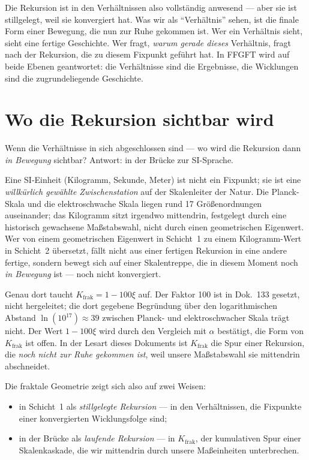 Die Rekursion ist in den Verhältnissen also vollständig anwesend --- aber
sie ist stillgelegt, weil sie konvergiert hat. Was wir als ``Verhältnis''
sehen, ist die finale Form einer Bewegung, die nun zur Ruhe gekommen
ist. Wer ein Verhältnis sieht, sieht eine fertige Geschichte. Wer fragt,
\emph{warum gerade dieses} Verhältnis, fragt nach der Rekursion, die zu
diesem Fixpunkt geführt hat. In FFGFT wird auf beide Ebenen geantwortet:
die Verhältnisse sind die Ergebnisse, die Wicklungen sind die
zugrundeliegende Geschichte.

\section{Wo die Rekursion sichtbar wird}

Wenn die Verhältnisse in sich abgeschlossen sind --- wo wird die
Rekursion dann \emph{in Bewegung} sichtbar? Antwort: in der Brücke zur
SI-Sprache.

Eine SI-Einheit (Kilogramm, Sekunde, Meter) ist nicht ein Fixpunkt; sie
ist eine \emph{willkürlich gewählte Zwischenstation} auf der Skalenleiter
der Natur. Die Planck-Skala und die elektroschwache Skala liegen rund 17
Größenordnungen auseinander; das Kilogramm sitzt irgendwo mittendrin,
festgelegt durch eine historisch gewachsene Maßstabswahl, nicht durch
einen geometrischen Eigenwert. Wer von einem geometrischen Eigenwert
in Schicht~1 zu einem Kilogramm-Wert in Schicht~2 übersetzt, fällt
nicht aus einer fertigen Rekursion in eine andere fertige, sondern
bewegt sich auf einer Skalentreppe, die in diesem Moment noch
\emph{in Bewegung} ist --- noch nicht konvergiert.

Genau dort taucht $K_{\mathrm{frak}} = 1 - 100\xi$ auf. Der Faktor 100
ist in Dok.~133 gesetzt, nicht hergeleitet; die dort gegebene Begründung
über den logarithmischen Abstand $\ln(10^{17}) \approx 39$ zwischen
Planck- und elektroschwacher Skala trägt nicht. Der Wert $1 - 100\xi$
wird durch den Vergleich mit $\alpha$ bestätigt, die Form von
$K_{\mathrm{frak}}$ ist offen. In der Lesart dieses Dokuments ist
$K_{\mathrm{frak}}$ die Spur einer Rekursion, die \emph{noch nicht zur
Ruhe gekommen ist}, weil unsere Maßstabswahl sie mittendrin abschneidet.

Die fraktale Geometrie zeigt sich also auf zwei Weisen:

\begin{itemize}\setlength\itemsep{2pt}
  \item in Schicht~1 als \emph{stillgelegte Rekursion} ---
        in den Verhältnissen, die Fixpunkte einer konvergierten
        Wicklungsfolge sind;
  \item in der Brücke als \emph{laufende Rekursion} ---
        in $K_{\mathrm{frak}}$, der kumulativen Spur einer
        Skalenkaskade, die wir mittendrin durch unsere Maßeinheiten
        unterbrechen.
\end{itemize}

